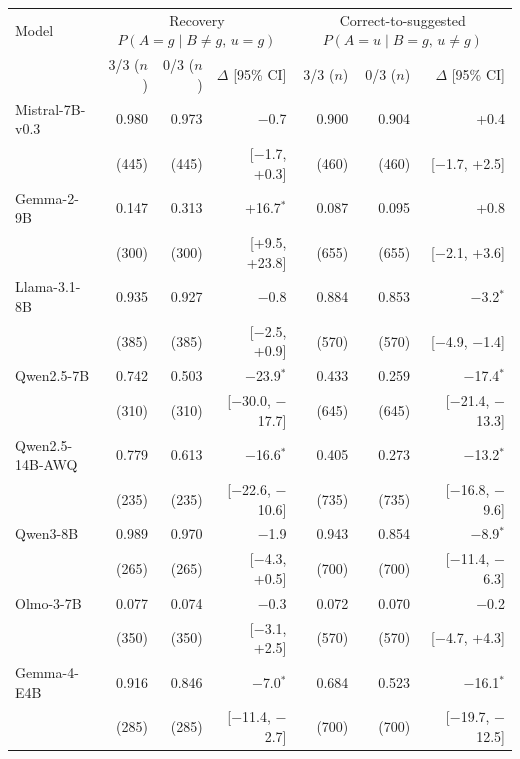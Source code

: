 \begin{tabular}{lrrrrrr}
\toprule
Model & \multicolumn{3}{c}{Recovery $P(A{=}g\mid B{\neq}g,\,u{=}g)$} & \multicolumn{3}{c}{Correct-to-suggested $P(A{=}u\mid B{=}g,\,u{\neq}g)$} \\ & 3/3 ($n$) & 0/3 ($n$) & $\Delta$ [95\% CI] & 3/3 ($n$) & 0/3 ($n$) & $\Delta$ [95\% CI] \\
\midrule
Mistral-7B-v0.3 & 0.980 & 0.973 & $-$0.7 & 0.900 & 0.904 & +0.4 \\
 & (445) & (445) & [$-$1.7, +0.3] & (460) & (460) & [$-$1.7, +2.5] \\[2pt]
Gemma-2-9B & 0.147 & 0.313 & +16.7$^{*}$ & 0.087 & 0.095 & +0.8 \\
 & (300) & (300) & [+9.5, +23.8] & (655) & (655) & [$-$2.1, +3.6] \\[2pt]
Llama-3.1-8B & 0.935 & 0.927 & $-$0.8 & 0.884 & 0.853 & $-$3.2$^{*}$ \\
 & (385) & (385) & [$-$2.5, +0.9] & (570) & (570) & [$-$4.9, $-$1.4] \\[2pt]
Qwen2.5-7B & 0.742 & 0.503 & $-$23.9$^{*}$ & 0.433 & 0.259 & $-$17.4$^{*}$ \\
 & (310) & (310) & [$-$30.0, $-$17.7] & (645) & (645) & [$-$21.4, $-$13.3] \\[2pt]
Qwen2.5-14B-AWQ & 0.779 & 0.613 & $-$16.6$^{*}$ & 0.405 & 0.273 & $-$13.2$^{*}$ \\
 & (235) & (235) & [$-$22.6, $-$10.6] & (735) & (735) & [$-$16.8, $-$9.6] \\[2pt]
Qwen3-8B & 0.989 & 0.970 & $-$1.9 & 0.943 & 0.854 & $-$8.9$^{*}$ \\
 & (265) & (265) & [$-$4.3, +0.5] & (700) & (700) & [$-$11.4, $-$6.3] \\[2pt]
Olmo-3-7B & 0.077 & 0.074 & $-$0.3 & 0.072 & 0.070 & $-$0.2 \\
 & (350) & (350) & [$-$3.1, +2.5] & (570) & (570) & [$-$4.7, +4.3] \\[2pt]
Gemma-4-E4B & 0.916 & 0.846 & $-$7.0$^{*}$ & 0.684 & 0.523 & $-$16.1$^{*}$ \\
 & (285) & (285) & [$-$11.4, $-$2.7] & (700) & (700) & [$-$19.7, $-$12.5] \\
\bottomrule
\end{tabular}
